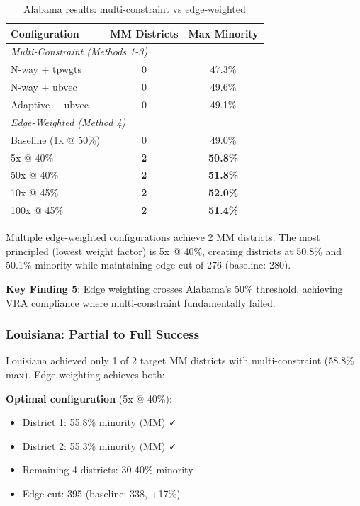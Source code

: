 \begin{table}[h]
\centering
\begin{tabular}{lcc}
\toprule
Configuration & MM Districts & Max Minority \\
\midrule
\multicolumn{3}{l}{\textit{Multi-Constraint (Methods 1-3)}} \\
N-way + tpwgts & 0 & 47.3\% \\
N-way + ubvec & 0 & 49.6\% \\
Adaptive + ubvec & 0 & 49.1\% \\
\midrule
\multicolumn{3}{l}{\textit{Edge-Weighted (Method 4)}} \\
Baseline (1x @ 50\%) & 0 & 49.0\% \\
5x @ 40\% & \textbf{2} & \textbf{50.8\%} \\
50x @ 40\% & \textbf{2} & \textbf{51.8\%} \\
10x @ 45\% & \textbf{2} & \textbf{52.0\%} \\
100x @ 45\% & \textbf{2} & \textbf{51.4\%} \\
\bottomrule
\end{tabular}
\caption{Alabama results: multi-constraint vs edge-weighted}
\label{tab:alabama_edge_weighted}
\end{table}

Multiple edge-weighted configurations achieve 2 MM districts. The most principled (lowest weight factor) is 5x @ 40\%, creating districts at 50.8\% and 50.1\% minority while maintaining edge cut of 276 (baseline: 280).

\textbf{Key Finding 5}: Edge weighting crosses Alabama's 50\% threshold, achieving VRA compliance where multi-constraint fundamentally failed.

\subsubsection{Louisiana: Partial to Full Success}

Louisiana achieved only 1 of 2 target MM districts with multi-constraint (58.8\% max). Edge weighting achieves both:

\textbf{Optimal configuration} (5x @ 40\%):
\begin{itemize}
\item District 1: 55.8\% minority (MM) ✓
\item District 2: 55.3\% minority (MM) ✓
\item Remaining 4 districts: 30-40\% minority
\item Edge cut: 395 (baseline: 338, +17\%)
\end{itemize}

